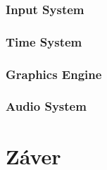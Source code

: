\documentclass[10pt,twoside,slovak,a4paper,hidelinks]{article} %
\begin{document}
\subsubsection{Input System}
\subsubsection{Time System}
\subsubsection{Graphics Engine}
\subsubsection{Audio System}
\section{Záver}




%
\end{document}
